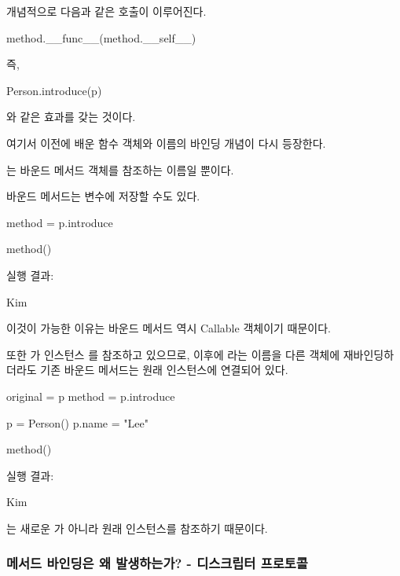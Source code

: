 개념적으로 다음과 같은 호출이 이루어진다.

\begin{dhkcode}
method.__func__(method.__self__)
\end{dhkcode}

즉,

\begin{dhkcode}
Person.introduce(p)
\end{dhkcode}

와 같은 효과를 갖는 것이다.

여기서 이전에 배운 함수 객체와 이름의 바인딩 개념이 다시 등장한다.

는 바운드 메서드 객체를 참조하는 이름일 뿐이다.

\begin{dhknote}
\begin{dhksmry}[centered]
바운드 메서드는 변수에 저장할 수도 있다.
\end{dhksmry}
\end{dhknote}

\begin{dhkcode}
method = p.introduce

method()
\end{dhkcode}

실행 결과:

\begin{dhkzsh}
Kim
\end{dhkzsh}

이것이 가능한 이유는 바운드 메서드 역시 Callable 객체이기 때문이다.

또한 가 인스턴스 를 참조하고 있으므로, 이후에 라는 이름을 다른 객체에 재바인딩하더라도 기존 바운드 메서드는 원래 인스턴스에 연결되어 있다.

\begin{dhkcode}
original = p
method = p.introduce

p = Person()
p.name = "Lee"

method()
\end{dhkcode}

실행 결과:

\begin{dhkzsh}
Kim
\end{dhkzsh}

는 새로운 가 아니라 원래 인스턴스를 참조하기 때문이다.

\subsubsection{메서드 바인딩은 왜 발생하는가? - 디스크립터 프로토콜}

